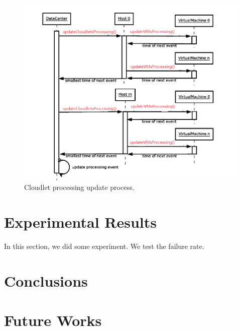 \begin{figure}
	\centering
	\includegraphics[width=1\textwidth]{./figures/3-processingSequence.png}
	\caption{\label{fig:processingSequence}Cloudlet processing update process.}
\end{figure}

\section{Experimental Results}
In this section, we did some experiment. We test the failure rate.

\section{Conclusions}


\section{Future Works}



